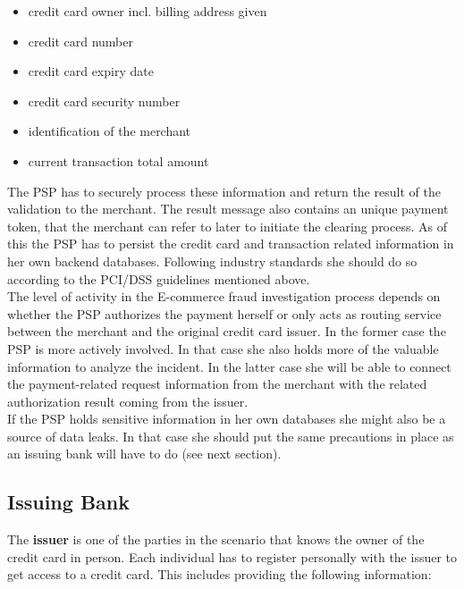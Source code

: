 \begin{itemize}
		\item credit card owner incl. billing address given
		\item credit card number
		\item credit card expiry date
		\item credit card security number
		\item identification of the merchant
		\item current transaction total amount
\end{itemize}

The \gls{PSP} has to securely process these information and return the result of the validation to the merchant. The result message also contains an unique payment token, that the merchant can refer to later to initiate the clearing process. As of this the \gls{PSP} has to persist the credit card and transaction related information in her own backend databases. Following industry standards she should do so according to the PCI/DSS guidelines mentioned above.\\

The level of activity in the E-commerce fraud investigation process depends on whether the \gls{PSP} authorizes the payment herself or only acts as routing service between the merchant and the original credit card issuer. In the former case the \gls{PSP} is more actively involved. In that case she also holds more of the valuable information to analyze the incident. In the latter case she will be able to connect the payment-related request information from the merchant with the related authorization result coming from the issuer.\\

If the \gls{PSP} holds sensitive information in her own databases she might also be a source of data leaks. In that case she should put the same precautions in place as an issuing bank will have to do (see next section).


\subsection{Issuing Bank}
\label{subsec:stakeholder_issuer}

The \textbf{issuer} is one of the parties in the scenario that knows the owner of the credit card in person. Each individual has to register personally with the issuer to get access to a credit card. This includes providing the following information:\@

